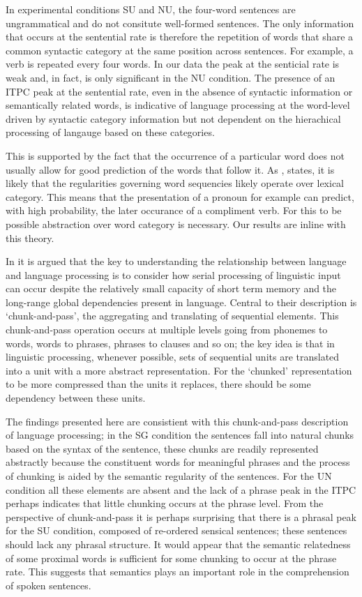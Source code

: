 \documentclass[a4paper,10pt,twoside]{article}
\begin{document}
{In experimental conditions SU and NU, the four-word sentences are
ungrammatical and do not consitute well-formed sentences. The only
information that occurs at the sentential rate is therefore the
repetition of words that share a common syntactic category at the same
position across sentences. For example, a verb is repeated every four
words. In our data the peak at the senticial rate is weak and, in
fact, is only significant in the NU condition. The presence of an ITPC
peak at the sentential rate, even in the absence of syntactic
information or semantically related words, is indicative of language
processing at the word-level driven by syntactic category information
but not dependent on the hierachical processing of langauge based on
these categories.

This is supported by the fact that the occurrence of a particular word
does not usually allow for good prediction of the words that follow
it. As \cite{Pulvermuller2002}, states, it is likely that the regularities
governing word sequencies likely operate over lexical category. This
means that the presentation of a pronoun for example can predict, with
high probability, the later occurance of a compliment verb. For this
to be possible abstraction over word category is necessary. Our
results are inline with this theory.

In \cite{ChristiansenChater2016} it is argued that the key to
understanding the relationship between language and language
processing is to consider how serial processing of linguistic input
can occur despite the relatively small capacity of short term memory
and the long-range global dependencies present in language. Central to
their description is \lq{}chunk-and-pass\rq{}, the aggregating and
translating of sequential elements. This chunk-and-pass operation
occurs at multiple levels going from phonemes to words, words to
phrases, phrases to clauses and so on; the key idea is that in
linguistic processing, whenever possible, sets of sequential units are
translated into a unit with a more abstract representation. For the
\lq{}chunked\rq{} representation to be more compressed than the units
it replaces, there should be some dependency between these
units.

The findings presented here are consistient with this chunk-and-pass
description of language processing; in the SG condition the sentences
fall into natural chunks based on the syntax of the sentence, these
chunks are readily represented abstractly because the constituent
words for meaningful phrases and the process of chunking is aided by
the semantic regularity of the sentences. For the UN condition all
these elements are absent and the lack of a phrase peak in the ITPC
perhaps indicates that little chunking occurs at the phrase
level. From the perspective of chunk-and-pass it is perhaps surprising
that there is a phrasal peak for the SU condition, composed of
re-ordered sensical sentences; these sentences should lack any phrasal
structure. It would appear that the semantic relatedness of some
proximal words is sufficient for some chunking to occur at the phrase
rate. This suggests that semantics plays an important role in the
comprehension of spoken sentences.

}
\end{document}

